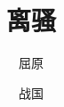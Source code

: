 \documentclass[a4paper,12pt,UTF8,twoside]{ctexbook}
\title{\heiti\zihao{0} 离骚}
\author{屈原}
\date{战国}
\newenvironment{yuanwen}{\bfseries\zihao{4}}
\begin{document}
	\maketitle
	
	\tableofcontents
	
	\frontmatter
	
	\chapter{前言}
	
	\chapter{序一}
	
	\mainmatter
	\chapter{}
	
	\begin{yuanwen}
		帝高阳之苗裔兮，朕皇考曰伯庸。
		
		摄提贞于孟陬兮，惟庚寅吾以降。
		
		皇览揆余初度兮，肇锡余以嘉名。
		
		名余曰正则兮，字余曰灵均。
		
		
	\end{yuanwen}
\end{document}
